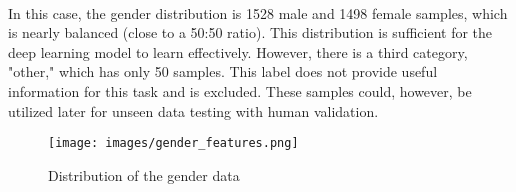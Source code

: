 \paragraph{}
In this case, the gender distribution is 1528 male and 1498 female samples, which is nearly balanced (close to a 50:50 ratio). This distribution is sufficient for the deep learning model to learn effectively. However, there is a third category, "other," which has only 50 samples. This label does not provide useful information for this task and is excluded. These samples could, however, be utilized later for unseen data testing with human validation.

\begin{figure}[h] %
    \centering %
    \texttt{[image: images/gender\_features.png]}
    \caption{Distribution of the gender data} %
    \label{fig:gender_distribution} %
\end{figure}